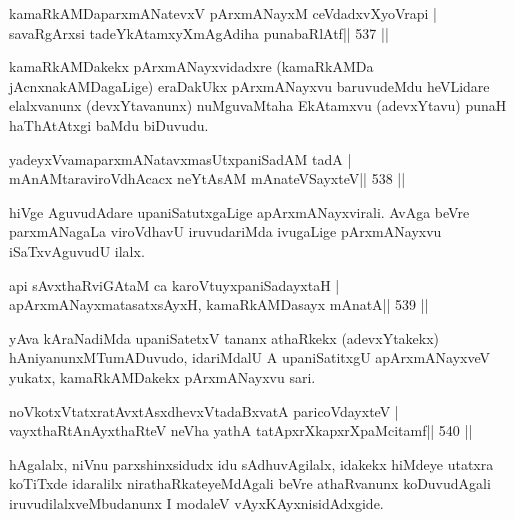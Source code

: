 

\begin{shl}
kamaRkAMDaparxmANatevxV pArxmANayxM ceVdadxvXyoVrapi |
savaRgArxsi tadeYkAtamxyXmAgAdiha punabaRlAtf\hfill || 537 ||
\end{shl}

\begin{artha}
kamaRkAMDakekx pArxmANayxvidadxre (kamaRkAMDa jAcnxnakAMDagaLige)
eraDakUkx pArxmANayxvu baruvudeMdu heVLidare elalxvanunx
(devxYtavanunx) nuMguvaMtaha EkAtamxvu (adevxYtavu) punaH haThAtAtxgi
baMdu biDuvudu.
\end{artha} 



\begin{shl}
yadeyxVvamaparxmANatavxmasUtxpaniSadAM tadA |
mAnAMtaraviroVdhAcacx neYtAsAM mAnateVSayxteV\hfill || 538 ||
\end{shl}

\begin{artha}
hiVge AguvudAdare upaniSatutxgaLige apArxmANayxvirali. AvAga beVre parxmANagaLa viroVdhavU iruvudariMda ivugaLige pArxmANayxvu iSaTxvAguvudU ilalx.
\end{artha}

\begin{shl}
api sAvxthaRviGAtaM ca karoVtuyxpaniSadayxtaH |
apArxmANayxmatasatxsAyxH, kamaRkAMDasayx mAnatA\hfill || 539 ||
\end{shl}

\begin{artha}
yAva kAraNadiMda upaniSatetxV tananx athaRkekx (adevxYtakekx)
hAniyanunxMTumADuvudo, idariMdalU A upaniSatitxgU apArxmANayxveV
yukatx, kamaRkAMDakekx pArxmANayxvu sari.
\end{artha}


\begin{shl}
noVkotxVtatxratAvxtAsxdhevxVtadaBxvatA paricoVdayxteV |
vayxthaRtAnAyxthaRteV neVha yathA tatApxrXkapxrXpaMcitamf\hfill || 540 ||
\end{shl}

\begin{artha}
hAgalalx, niVnu parxshinxsidudx idu sAdhuvAgilalx, idakekx hiMdeye
utatxra koTiTxde idaralilx nirathaRkateyeMdAgali beVre athaRvanunx
koDuvudAgali iruvudilalxveMbudanunx I modaleV vAyxKAyxnisidAdxgide.
\end{artha}

